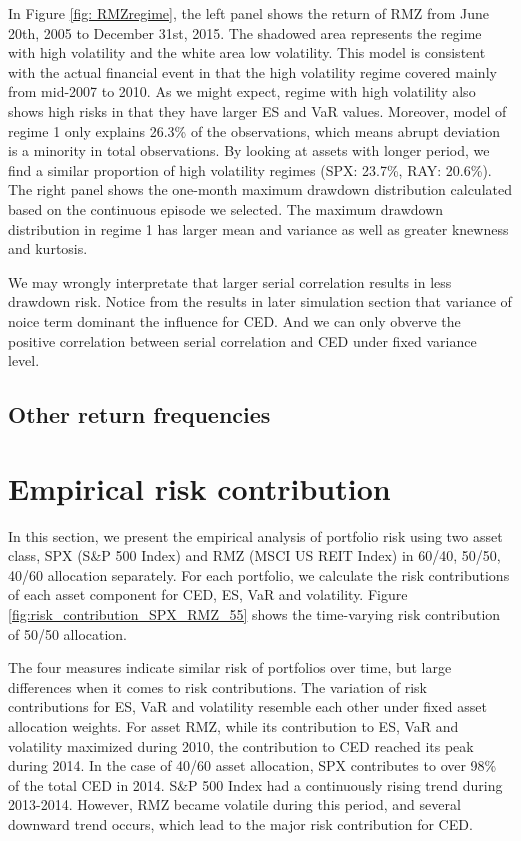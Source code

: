 \documentclass[11pt]{article}
\begin{document}
In Figure \ref{fig: RMZregime}, the left panel shows the return of RMZ from June 20th, 2005 to December 31st, 2015. The shadowed area represents the regime with high volatility and the white area low volatility. This model is consistent with the actual financial event in that the high volatility regime covered mainly from mid-2007 to 2010. As we might expect, regime with high volatility also shows high risks in that they have larger ES and VaR values. Moreover, model of regime 1 only explains 26.3\% of the observations, which means abrupt deviation is a minority in total observations. By looking at assets with longer period, we find a similar proportion of high volatility regimes (SPX: 23.7\%, RAY: 20.6\%). The right panel shows the one-month maximum drawdown distribution calculated based on the continuous episode we selected. The maximum drawdown distribution in regime 1 has larger mean and variance as well as greater knewness and kurtosis. 

We may wrongly interpretate that larger serial correlation results in less drawdown risk. Notice from the results in later simulation section that variance of noice term dominant the influence for CED. And we can only obverve the positive correlation between serial correlation and CED under fixed variance level.


\subsection{Other return frequencies}

\section{Empirical risk contribution}

In this section, we present the empirical analysis of portfolio risk using two asset class, SPX (S\&P 500 Index) and RMZ (MSCI US REIT Index) in 60/40, 50/50, 40/60 allocation separately. For each portfolio, we calculate the risk contributions of each asset component for CED, ES, VaR and volatility. Figure \ref{fig:risk_contribution_SPX_RMZ_55} shows the time-varying risk contribution of 50/50 allocation. 

The four measures indicate similar risk of portfolios over time, but large differences when it comes to risk contributions. The variation of risk contributions for ES, VaR and volatility resemble each other under fixed asset allocation weights. For asset RMZ, while its contribution to ES, VaR and volatility maximized during 2010, the contribution to CED reached its peak during 2014. In the case of 40/60 asset allocation, SPX contributes to over 98\% of the total CED in 2014. S\&P 500 Index had a continuously rising trend during 2013-2014. However, RMZ became volatile during this period, and several downward trend occurs, which lead to the major risk contribution for CED.
\end{document}
